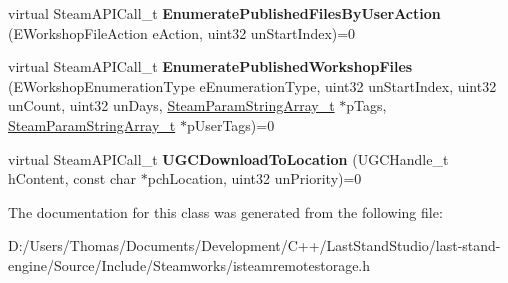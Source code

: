 \begin{DoxyCompactItemize}
\item 
\hypertarget{classISteamRemoteStorage_a5480a42fd381a3f6e2daf6b86dad5aae}{}virtual Steam\+A\+P\+I\+Call\+\_\+t {\bfseries Enumerate\+Published\+Files\+By\+User\+Action} (E\+Workshop\+File\+Action e\+Action, uint32 un\+Start\+Index)=0\label{classISteamRemoteStorage_a5480a42fd381a3f6e2daf6b86dad5aae}

\item 
\hypertarget{classISteamRemoteStorage_ab4082af7759f31781d0ba270f5166e3d}{}virtual Steam\+A\+P\+I\+Call\+\_\+t {\bfseries Enumerate\+Published\+Workshop\+Files} (E\+Workshop\+Enumeration\+Type e\+Enumeration\+Type, uint32 un\+Start\+Index, uint32 un\+Count, uint32 un\+Days, \hyperlink{structSteamParamStringArray__t}{Steam\+Param\+String\+Array\+\_\+t} $\ast$p\+Tags, \hyperlink{structSteamParamStringArray__t}{Steam\+Param\+String\+Array\+\_\+t} $\ast$p\+User\+Tags)=0\label{classISteamRemoteStorage_ab4082af7759f31781d0ba270f5166e3d}

\item 
\hypertarget{classISteamRemoteStorage_a84e1a028674707a0c31b254e41a6f804}{}virtual Steam\+A\+P\+I\+Call\+\_\+t {\bfseries U\+G\+C\+Download\+To\+Location} (U\+G\+C\+Handle\+\_\+t h\+Content, const char $\ast$pch\+Location, uint32 un\+Priority)=0\label{classISteamRemoteStorage_a84e1a028674707a0c31b254e41a6f804}

\end{DoxyCompactItemize}


The documentation for this class was generated from the following file\+:\begin{DoxyCompactItemize}
\item 
D\+:/\+Users/\+Thomas/\+Documents/\+Development/\+C++/\+Last\+Stand\+Studio/last-\/stand-\/engine/\+Source/\+Include/\+Steamworks/isteamremotestorage.\+h\end{DoxyCompactItemize}
